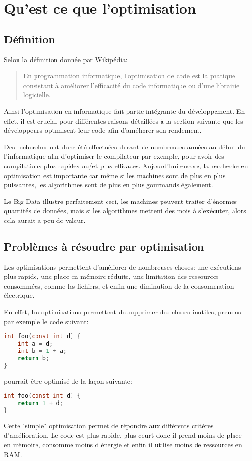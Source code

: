 \section{Qu'est ce que l'optimisation}
\subsection{Définition}
Selon la définition donnée par Wikipédia:
\begin{quote}
    En programmation informatique, l'optimisation de code est la pratique consistant à améliorer l'efficacité du code informatique ou d'une librairie logicielle. \cite{wiki:Optimisation_de_code}
\end{quote}
Ainsi l'optimisation en informatique fait partie intégrante du développement. En effet, il est crucial pour différentes raisons détaillées à la section suivante que les développeurs optimisent leur code afin d'améliorer son rendement.

Des recherches ont donc été effectuées durant de nombreuses années au début de l'informatique afin d'optimiser le compilateur par exemple, pour avoir des compilations plus rapides ou/et plus efficaces. Aujourd'hui encore, la rercheche en optimisation est importante car même si les machines sont de plus en plus puissantes, les algorithmes sont de plus en plus gourmands également.

Le Big Data illustre parfaitement ceci, les machines peuvent traiter d'énormes quantités de données, mais si les algorithmes mettent des mois à s'exécuter, alors cela aurait a peu de valeur.

\subsection{Problèmes à résoudre par optimisation}
Les optimisations permettent d'améliorer de nombreuses choses: une exécutions plus rapide, une place en mémoire réduite, une limitation des ressources consommées, comme les fichiers, et enfin une diminution de la consommation électrique.

En effet, les optimisations permettent de supprimer des choses inutiles, prenons par exemple le code suivant:
\newpage
\begin{center}
\begin{lstlisting}[language=c, xleftmargin=.35\textwidth, caption={Exemple de code non optimisé}, captionpos=b]
int foo(const int d) {
    int a = d;
    int b = 1 + a;
    return b;
}
\end{lstlisting}
\end{center}
pourrait être optimisé de la façon suivante:
\begin{lstlisting}[language=c, xleftmargin=.35\textwidth, caption={Exemple de code optimisé}, captionpos=b]
int foo(const int d) {
    return 1 + d;
}
\end{lstlisting}
Cette "simple" optimisation permet de répondre aux différents critères d'amélioration. Le code est plus rapide, plus court donc il prend moins de place en mémoire, consomme moins d'énergie et enfin il utilise moins de ressources en RAM.

